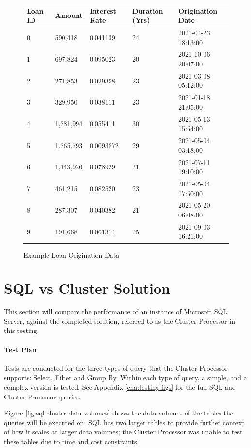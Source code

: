 \begin{figure}[ht]
	\centering
	\begin{tabular}{| l | l | l | l | l |}
		\hline
		\textbf{Loan ID} & \textbf{Amount} & \textbf{Interest Rate} & \textbf{Duration (Yrs)} & \textbf{Origination Date} \\ \hline 
		0 & 590,418 & 0.041139 & 24 & 2021-04-23 18:13:00   \\ \hline
		1 & 697,824 & 0.095023 & 20 & 2021-10-06 20:07:00    \\ \hline
		2 & 271,853 & 0.029358 & 23 & 2021-03-08 05:12:00    \\ \hline
		3 & 329,950 & 0.038111 & 23 & 2021-01-18 21:05:00    \\ \hline
		4 & 1,381,994 & 0.055411 & 30 & 2021-05-13 15:54:00  \\ \hline
		5 & 1,365,793 & 0.0093872 & 29 & 2021-05-04 03:18:00  \\ \hline
		6 & 1,143,926 & 0.078929 & 21 & 2021-07-11 19:10:00   \\ \hline
		7 & 461,215 & 0.082520 & 23 & 2021-05-04 17:50:00    \\ \hline
		8 & 287,307 & 0.040382 & 21 & 2021-05-20 06:08:00   \\ \hline
		9 & 191,668 & 0.061314 & 25 & 2021-09-03 16:21:00    \\ \hline
	\end{tabular}
	\caption{Example Loan Origination Data}
	\label{fig:fake-loan-data}
\end{figure}

\section{SQL vs Cluster Solution}
This section will compare the performance of an instance of Microsoft SQL Server, against the completed solution, referred to as the Cluster Processor in this testing. 

\paragraph{Test Plan}
Tests are conducted for the three types of query that the Cluster Processor supports: Select, Filter and Group By. Within each type of query, a simple, and a complex version is tested. See Appendix \ref{cha:testing-figs} for the full SQL and Cluster Processor queries.

Figure \ref{fig:sql-cluster-data-volumes} shows the data volumes of the tables the queries will be executed on. SQL has two larger tables to provide further context of how it scales at larger data volumes; the Cluster Processor was unable to test these tables due to time and cost constraints.

